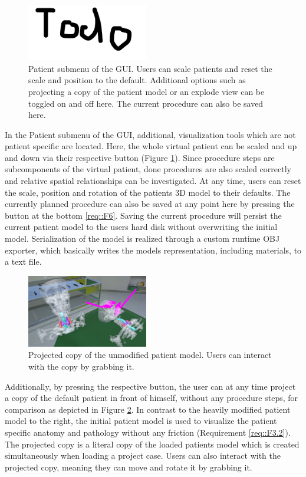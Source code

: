 \begin{figure}[ht]
  \centering
  \includegraphics[width=200px]{images/todo.png}
  \caption{\label{fig::PatientVisualization}Patient submenu of the GUI. Users can scale patients and reset the scale and position to the default. Additional options such as projecting a 
  copy of the patient model or an explode view can be toggled on and off here. The current procedure can also be saved here.}
\end{figure}

In the Patient submenu of the GUI, additional, visualization tools which are not patient specific are located.
Here, the whole virtual patient can be scaled and up and down via their respective button (Figure \ref{fig::PatientVisualization}).
Since procedure steps are subcomponents of the virtual patient, done procedures are also scaled correctly and relative spatial relationships can be investigated. 
At any time, users can reset the scale, position and rotation of the patients 3D model to their defaults.
The currently planned procedure can also be saved at any point here by pressing the button at the bottom \ref{req::F6}.
Saving the current procedure will persist the current patient model to the users hard disk without overwriting the initial model.
Serialization of the model is realized through a custom runtime OBJ exporter, which basically writes the models representation, including materials, to a text file.

\begin{figure}[ht]
  \centering
  \includegraphics[width=200px]{images/implementation/features/visualization/project_copy.png}
  \caption{\label{fig::ProjectCopy} Projected copy of the unmodified patient model. Users can interact with the copy by grabbing it.}
\end{figure}

Additionally, by pressing the respective button, the user can at any time project a copy of the default patient in front of himself, without any procedure steps, for comparison as 
depicted in Figure \ref{fig::ProjectCopy}.
In contrast to the heavily modified patient model to the right, the initial patient model is used to visualize the patient specific anatomy and pathology without any 
friction (Requirement \ref{req::F3.2}).
The projected copy is a literal copy of the loaded patients model which is created simultaneously when loading a project case.
Users can also interact with the projected copy, meaning they can move and rotate it by grabbing it.

